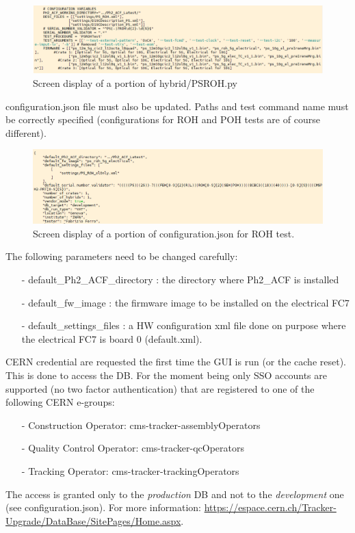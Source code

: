 \documentclass[10pt,a4paper]{article}
\begin{document}
\begin{figure}[h!]
\centering
 \includegraphics[width=\linewidth]{psroh.png} 
  \caption{Screen display of a portion of hybrid/PSROH.py}
  \label{screenshot}	
\end{figure}

configuration.json file must also be updated. Paths and test command name must be correctly specified (configurations for ROH and POH tests are of course different).
\begin{figure}[h!]
\centering
 \includegraphics[width=\linewidth]{configuration.png} 
  \caption{Screen display of a portion of configuration.json for ROH test.}
\end{figure}

The following parameters need to be changed carefully:
\begin{itemize}
\item[-] default\_Ph2\_ACF\_directory : the directory where Ph2\_ACF is installed
\item[-] default\_fw\_image : the firmware image to be installed on the electrical FC7
\item[-] default\_settings\_files : a HW configuration xml file done on purpose where the electrical FC7 is board 0 (default.xml). 
\end{itemize}

CERN credential are requested the first time the GUI is run (or the cache reset). This is done to access the DB. For the moment being only SSO accounts are supported (no two factor authentication) that are registered to one of the following CERN e-groups:
\begin{itemize}
\item[-] Construction Operator: cms-tracker-assemblyOperators
\item[-] Quality Control Operator: cms-tracker-qcOperators
\item[-] Tracking Operator: cms-tracker-trackingOperators
\end{itemize}
The access is granted only to the {\it production} DB and not to the {\it development} one (see configuration.json). For more information:
\url{https://espace.cern.ch/Tracker-Upgrade/DataBase/SitePages/Home.aspx}.
\end{document}
